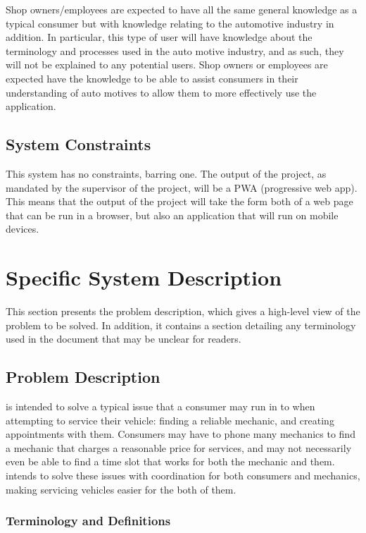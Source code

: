 \documentclass[12pt]{article}
\begin{document}
Shop owners/employees are expected to have all the same general knowledge as a typical consumer but with knowledge relating to the automotive industry in addition. In particular, this type of user will have knowledge about the terminology and processes used in the auto motive industry, and as such, they will not be explained to any potential users. Shop owners or employees are expected have the knowledge to be able to assist consumers in their understanding of auto motives to allow them to more effectively use the application.

\subsection{System Constraints}
\label{constraints}

This system has no constraints, barring one. The output of the project, as mandated by the supervisor of the project, will be a PWA (progressive web app). This means that the output of the project will take the form both of a web page that can be run in a browser, but also an application that will run on mobile devices. 

\section{Specific System Description} \label{sec:SSD}

This section presents the problem description, which gives a high-level view of the problem to be solved. In addition, it contains a section detailing any terminology used in the document that may be unclear for readers.

\subsection{Problem Description} \label{Sec_pd}

\progname{} is intended to solve a typical issue that a consumer may run in to when attempting to service their vehicle: finding a reliable mechanic, and creating appointments with them. Consumers may have to phone many mechanics to find a mechanic that charges a reasonable price for services, and may not necessarily even be able to find a time slot that works for both the mechanic and them. \progname intends to solve these issues with coordination for both consumers and mechanics, making servicing vehicles easier for the both of them.

\subsubsection{Terminology and  Definitions}
\end{document}

